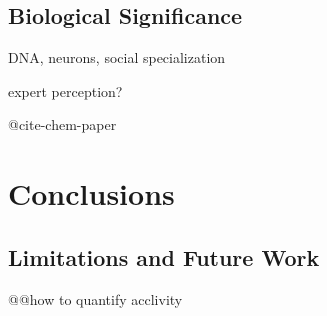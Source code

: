 \documentclass[letterpaper]{article}
\begin{document}
\subsection{Biological Significance}

DNA, neurons, social specialization

expert perception?

@cite-chem-paper

\section{Conclusions}

\subsection{Limitations and Future Work}

@@how to quantify acclivity



\end{document}
